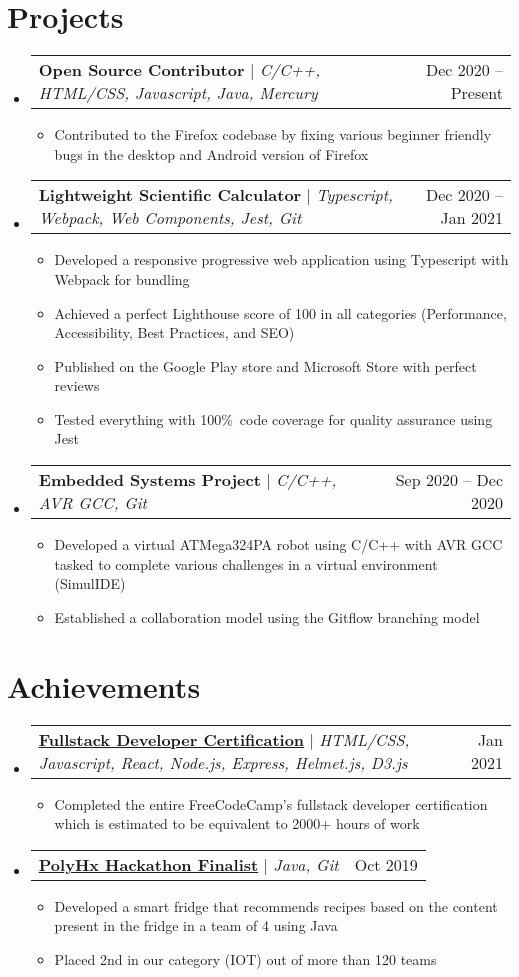 \documentclass[letterpaper,11pt]{article}
\makeatletter
\newcommand{\resumeItem}[1]{
  \item\small{
    {#1 \vspace{-2pt}}
  }
}
\newcommand{\resumeProjectHeading}[2]{
    \item
    \begin{tabular*}{0.97\textwidth}{l@{\extracolsep{\fill}}r}
      \small#1 & #2 \\
    \end{tabular*}\vspace{-7pt}
}
\newcommand{\resumeSubHeadingListStart}{\begin{itemize}[leftmargin=0.15in, label={}]}
\newcommand{\resumeSubHeadingListEnd}{\end{itemize}}
\newcommand{\resumeItemListStart}{\begin{itemize}}
\newcommand{\resumeItemListEnd}{\end{itemize}\vspace{-5pt}}
\makeatother
\begin{document}
\section{Projects}
    \resumeSubHeadingListStart
		\resumeProjectHeading
			{\textbf{Open Source Contributor} $|$ \emph{C/C++, HTML/CSS, Javascript, Java, Mercury}}{Dec 2020 -- Present}
    	\resumeItemListStart
    		\resumeItem{Contributed to the Firefox codebase by fixing various beginner friendly bugs in the desktop and Android version of Firefox}
    	\resumeItemListEnd
      \resumeProjectHeading
          {\textbf{Lightweight Scientific Calculator} $|$ \emph{Typescript, Webpack, Web Components, Jest, Git }}{Dec 2020 -- Jan 2021}
          \resumeItemListStart
            \resumeItem{Developed a responsive progressive web application using Typescript with Webpack for bundling}
            \resumeItem{Achieved a perfect Lighthouse score of 100 in all categories (Performance, Accessibility, Best Practices, and SEO)}
            \resumeItem{Published on the Google Play store and Microsoft Store with perfect reviews}
            \resumeItem{Tested everything with 100\%\ code coverage for quality assurance using Jest}
          \resumeItemListEnd
      \resumeProjectHeading
          {\textbf{Embedded Systems Project} $|$ \emph{C/C++, AVR GCC, Git}}{Sep 2020 -- Dec 2020}
          \resumeItemListStart
            \resumeItem{Developed a virtual ATMega324PA robot using C/C++ with AVR GCC tasked to complete various challenges in a virtual environment (SimulIDE)}
            \resumeItem{Established a collaboration model using the Gitflow branching model}
          \resumeItemListEnd
    \resumeSubHeadingListEnd


\section{Achievements}
    \resumeSubHeadingListStart
		\resumeProjectHeading
			{\textbf{\href{}{Fullstack Developer Certification}} $|$ \emph{HTML/CSS, Javascript, React, Node.js, Express, Helmet.js, D3.js }}{Jan 2021}
    	\resumeItemListStart
    		\resumeItem{Completed the entire FreeCodeCamp's fullstack developer certification which is estimated to be equivalent to 2000+ hours of work}
    	\resumeItemListEnd
    	
    	\resumeProjectHeading
			{\textbf{\href{}{PolyHx Hackathon Finalist}} $|$ \emph{Java, Git}}{Oct 2019}
    	\resumeItemListStart
    		\resumeItem{Developed a smart fridge that recommends recipes based on the content present in the fridge in a team of 4 using Java}
    		\resumeItem{Placed 2nd in our category (IOT) out of more than 120 teams}
    	\resumeItemListEnd
    \resumeSubHeadingListEnd
\end{document}
